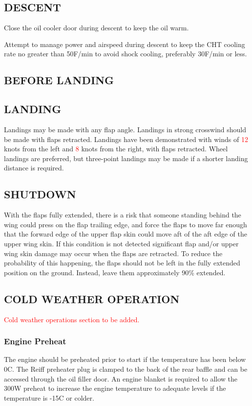 \subsection{DESCENT}
Close the oil cooler door during descent to keep the oil warm.
\begin{Note} 
Attempt to manage power and airspeed during descent to keep the CHT cooling rate no greater than 50\textdegree F/min to avoid shock cooling, preferably 30\textdegree F/min or less.
\end{Note}


\subsection{BEFORE LANDING}

\subsection{LANDING}
Landings may be made with any flap angle. Landings in strong crosswind should be made with flaps retracted. Landings have been demonstrated with winds of \textcolor{red}{12} knots from the left and \textcolor{red}{8} knots from the right, with flaps retracted. Wheel landings are preferred, but three-point landings may be made if a shorter landing distance is required.

\subsection{SHUTDOWN}
\begin{Note}[CAUTION]
With the flaps fully extended, there is a risk that someone standing behind the wing could press on the flap trailing edge, and force the flaps to move far enough that the forward edge of the upper flap skin could move aft of the aft edge of the upper wing skin. If this condition is not detected significant flap and/or upper wing skin damage may occur when the flaps are retracted. To reduce the probability of this happening, the flaps should not be left in the fully extended position on the ground. Instead, leave them approximately 90\% extended.\end{Note}


\subsection{COLD WEATHER OPERATION}
\textcolor{red}{Cold weather operations section to be added.}
\subsubsection{Engine Preheat} The engine should be preheated prior to start if the temperature has been below 0\textdegree C.  The Reiff preheater plug is clamped to the back of the rear baffle and can be accessed through the oil filler door.  An engine blanket is required to allow the 300W preheat to increase the engine temperature to adequate levels if the temperature is -15\textdegree C or colder.

